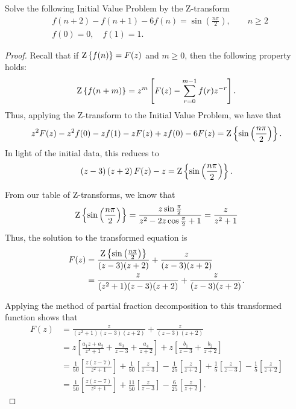 \begin{problem}{7}
  Solve the following Initial Value Problem by the Z-transform
  \begin{align*}
    &f(n + 2) - f(n+1) - 6f(n) = \sin \left(\frac{n \pi}{2}\right), \qquad n \geq 2 \\
    &f(0) = 0, \quad f(1) = 1.
  \end{align*}
\end{problem}

\begin{proof}
  Recall that if $\text{Z}\left\{ {f(n)} \right\} = F(z)$ and $m \geq 0$, then the following property holds:
  \begin{align*}
    \text{Z}\left\{ {f(n+m)} \right\} = z^m \left[F(z) - \sum_{r=0}^{m-1}f(r) z^{-r}\right].
  \end{align*}
  Thus, applying the Z-transform to the Initial Value Problem, we have that
  \begin{align*}
    z^2 F(z) - z^2f(0) - z f(1) - z F(z) + z f(0) - 6F(z) = \text{Z}\left\{ {\sin \left(\frac{n \pi}{2}\right)} \right\}.
  \end{align*}
  In light of the initial data, this reduces to
  \begin{align*}
    \left(z-3\right)\left(z+2\right) F(z) -z = \text{Z}\left\{ {\sin \left(\frac{n \pi}{2}\right)} \right\}.
  \end{align*}

  From our table of Z-transforms, we know that
  \begin{align*}
    \text{Z}\left\{ {\sin \left(\frac{n \pi}{2}\right)} \right\} = \frac{z \sin \frac{\pi}{2}}{z^2 - 2z \cos \frac{\pi}{2}+1} = \frac{z}{z^2+1}
  \end{align*}
  Thus, the solution to the transformed equation is
  \begin{align*}
    F(z) &= \frac{\text{Z}\left\{ {\sin \left(\frac{n \pi}{2}\right)} \right\}}{(z-3)(z+2)} + \frac{z}{(z-3)(z+2)} \\
    &= \frac{z}{(z^2+1)(z-3)(z+2)} + \frac{z}{(z-3)(z+2)}.
  \end{align*}

  Applying the method of partial fraction decomposition to this transformed function shows that
  \begin{align*}
    F(z)
    &= \frac{z}{(z^2+1)(z-3)(z+2)} + \frac{z}{(z-3)(z+2)} \\
    &= z\left[\frac{a_1z + a_2}{z^2+1} + \frac{a_3}{z-3}+\frac{a_4}{z+2}\right] + z \left[\frac{b_1}{z-3} + \frac{b_2}{z+2}\right]\\
    &= \frac{1}{50}\left[\frac{z(z-7)}{z^2+1}\right]+\frac{1}{50}\left[\frac{z}{z-3}\right] - \frac{1}{25}\left[\frac{z}{z+2}\right] + \frac{1}{5} \left[\frac{z}{z-3}\right] - \frac{1}{5}\left[\frac{z}{z+2}\right]\\
    &= \frac{1}{50}\left[\frac{z(z-7)}{z^2+1}\right]+\frac{11}{50}\left[\frac{z}{z-3}\right] - \frac{6}{25}\left[\frac{z}{z+2}\right].
  \end{align*}


\end{proof}
